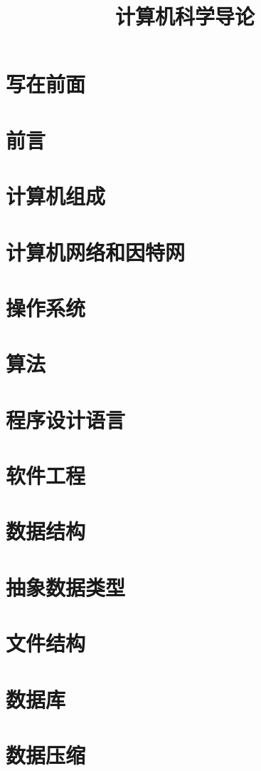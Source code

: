 \documentclass[oneside,a4paper]{book}
\title{计算机科学导论}
\begin{document}
\frontmatter
\maketitle
\chapter{写在前面}

\tableofcontents

\mainmatter
\chapter{前言}

\chapter{计算机组成}

\chapter{计算机网络和因特网}

\chapter{操作系统}

\chapter{算法}

\chapter{程序设计语言}

\chapter{软件工程}

\chapter{数据结构}

\chapter{抽象数据类型}

\chapter{文件结构}

\chapter{数据库}

\chapter{数据压缩}

\end{document}
